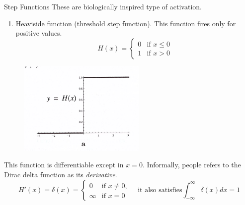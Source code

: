 \documentclass{beamer}
\begin{document}
\begin{frame}{Step Functions}
	These are biologically inspired type of activation.
	
	\begin{enumerate}
		\item Heaviside function (threshold step function). This function fires only for positive values.
		\begin{equation*}
			H(x)=
			\begin{cases}
				0 & \text{if }x\le 0 \\
				1 & \text{if } x >0
			\end{cases}
		\end{equation*}
	
	\end{enumerate}
\begin{figure}[h]
	\centering
	\includegraphics[scale=0.5]{../../Figures/fig_activation_22}
\end{figure}

This function is differentiable except in $x=0$.  Informally, people refers to the Dirac delta function as its \textit{derivative}. 
\begin{equation*}
	H'(x)= \delta(x) =\begin{cases}
		0 & \text{if } x \ne 0,\\
		\infty & \text{if } x=0
	\end{cases} \quad \text{it also satisfies} \int_{-\infty}^{\infty} \delta(x)dx =1
\end{equation*}


\end{frame}
\end{document}
